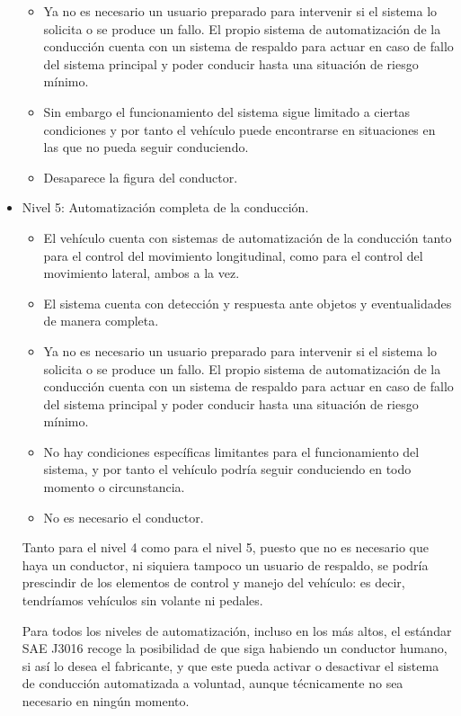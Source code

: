 \documentclass{pclass}
\begin{document}
\begin{itemize}
\begin{itemize}
		\item Ya no es necesario un usuario preparado para intervenir si el sistema lo solicita o se produce un fallo. El propio sistema de automatización de la conducción cuenta con un sistema de respaldo para actuar en caso de fallo del sistema principal y poder conducir hasta una situación de riesgo mínimo.
		
		\item Sin embargo el funcionamiento del sistema sigue limitado a ciertas condiciones y por tanto el vehículo puede encontrarse en situaciones en las que no pueda seguir conduciendo.
		
		\item Desaparece la figura del conductor.
	\end{itemize}

	\item Nivel 5: Automatización completa de la conducción.
	
	\begin{itemize}
		\item El vehículo cuenta con sistemas de automatización de la conducción tanto para el control del movimiento longitudinal, como para el control del movimiento lateral, ambos a la vez.
		
		\item El sistema cuenta con detección y respuesta ante objetos y eventualidades de manera completa.
		
		\item Ya no es necesario un usuario preparado para intervenir si el sistema lo solicita o se produce un fallo. El propio sistema de automatización de la conducción cuenta con un sistema de respaldo para actuar en caso de fallo del sistema principal y poder conducir hasta una situación de riesgo mínimo.
		
		\item No hay condiciones específicas limitantes para el funcionamiento del sistema, y por tanto el vehículo podría seguir conduciendo en todo momento o circunstancia.
		
		\item No es necesario el conductor.
	\end{itemize}

Tanto para el nivel 4 como para el nivel 5, puesto que no es necesario que haya un conductor, ni siquiera tampoco un usuario de respaldo, se podría prescindir de los elementos de control y manejo del vehículo: es decir, tendríamos vehículos sin volante ni pedales.

Para todos los niveles de automatización, incluso en los más altos, el estándar SAE J3016 recoge la posibilidad de que siga habiendo un conductor humano, si así lo desea el fabricante, y que este pueda activar o desactivar el sistema de conducción automatizada a voluntad, aunque técnicamente no sea necesario en ningún momento. \cite{cochesAutonomos}
\end{itemize}
\end{document}
